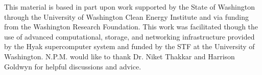 \documentclass[journal=apchd5,manuscript=article]{achemso}
\begin{document}
\begin{acknowledgement}
This material is based in part upon work supported by the State of Washington through the University of Washington Clean Energy Institute and via funding from the Washington Research Foundation. This work was facilitated though the use of advanced computational, storage, and networking infrastructure provided by the Hyak supercomputer system and funded by the STF at the University of Washington. N.P.M. would like to thank Dr. Niket Thakkar and Harrison Goldwyn for helpful discussions and advice.
\end{acknowledgement}


\end{document}
